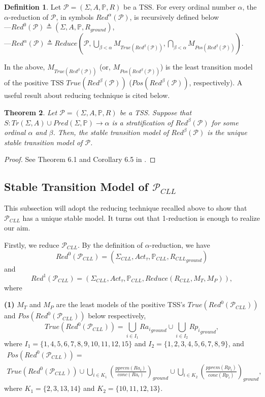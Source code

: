 \documentclass{elsarticle}
\theoremstyle{plain}
\newtheorem{theorem}{Theorem}[section]
\theoremstyle{definition}
\newtheorem{mydefn}[theorem]{Definition}
\begin{document}
\begin{mydefn}
    Let $\mathcal{P}=(\Sigma,A,\mathbb{P},R)$ be a TSS. For every ordinal number $\alpha$, the $\alpha$-reduction of $\mathcal P$, in symbols $Red^{\alpha}(\mathcal P)$, is recursively defined below\\
    ---$Red^0({\mathcal P})\triangleq(\Sigma,A,\mathbb{P},R_{ground})$, \\
    ---$Red^{\alpha}({\mathcal P})\triangleq Reduce({\mathcal P},\bigcup_{\beta<\alpha}M_{True(Red^{\beta}({\mathcal P}))},\bigcap_{\beta<\alpha}M_{Pos(Red^{\beta}({\mathcal P}))})$.
\end{mydefn}
In the above, $M_{True(Red^{\beta}({\mathcal P}))}$ (or, $M_{Pos(Red^{\beta}({\mathcal P}))}$) is the least transition
    model of the positive TSS $True(Red^{\beta}({\mathcal P}))$ ($Pos(Red^{\beta}({\mathcal P}))$, respectively).
A useful result about reducing technique is cited below.

\begin{theorem}\label{C:stable}
    Let $\mathcal{P}=(\Sigma,A,\mathbb{P},R)$ be a TSS. Suppose that $S:Tr(\Sigma,A)\cup Pred(\Sigma, \mathbb{P}) \longrightarrow \alpha$ is a stratification of $Red^{\beta}({\mathcal P})$ for some ordinal $\alpha$ and $\beta$. Then, the stable transition model of $Red^{\beta}({\mathcal P})$ is the unique stable transition model of $\mathcal P$.
\end{theorem}
\begin{proof}
  See Theorem 6.1 and Corollary 6.5 in \cite{Bol96}.
\end{proof}

\subsection{Stable Transition Model of ${\mathcal P}_{CLL}$}


    This subsection will adopt the reducing technique recalled above to show that ${\mathcal P}_{CLL}$ has a unique stable model. It turns out that 1-reduction is enough to realize our aim.


    Firstly, we reduce ${\mathcal P}_{CLL}$. By the definition of $\alpha$-reduction, we have
    \[Red^0({\mathcal P}_{CLL})=(\Sigma_{CLL},Act_{\tau},{\mathbb P}_{CLL},{R_{CLL}}_{ground})\]
    and
    \[Red^1({\mathcal P}_{CLL})=(\Sigma_{CLL},Act_{\tau},{\mathbb P}_{CLL},Reduce(R_{CLL},M_T,M_P)),\]
    where

\noindent    \textbf{(1)} $M_T$ and $M_P$ are the least models of the positive TSS's  $True(Red^0({\mathcal P}_{CLL}))$ and $Pos(Red^0({\mathcal P}_{CLL}))$ below respectively,
\[True(Red^0({\mathcal P}_{CLL}))= \underset{i\in I_1}\bigcup {Ra_i}_{ground} \cup \underset{i\in I_2}\bigcup  {Rp_i}_{ground},\]
where $I_1 = \{1,4,5,6,7,8,9,10,11,12,15\}$ and $I_2 = \{1,2,3,4,5,6,7,8,9\}$, and
\begin{multline*}
    Pos(Red^0({\mathcal P}_{CLL}))= \\True(Red^0({\mathcal P}_{CLL}))\cup
    \underset{i \in K_1}\bigcup \left(\frac{pprem(Ra_i)}{conc(Ra_i)}\right)_{ground}\cup
        \underset{i \in K_2}\bigcup \left(\frac{pprem(Rp_i)}{conc(Rp_i)}\right)_{ground},
\end{multline*}
where $K_1 =\{ 2,3,13,14\}$ and $K_2 = \{ 10,11,12,13\}$.
\end{document}
